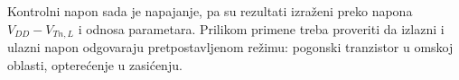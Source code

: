 Kontrolni napon sada je napajanje, pa su rezultati izraženi preko napona $V_{DD}-V_{Tn,L}$ i odnosa parametara. Prilikom primene treba proveriti da izlazni i ulazni napon odgovaraju pretpostavljenom režimu: pogonski tranzistor u omskoj oblasti, opterećenje u zasićenju.
